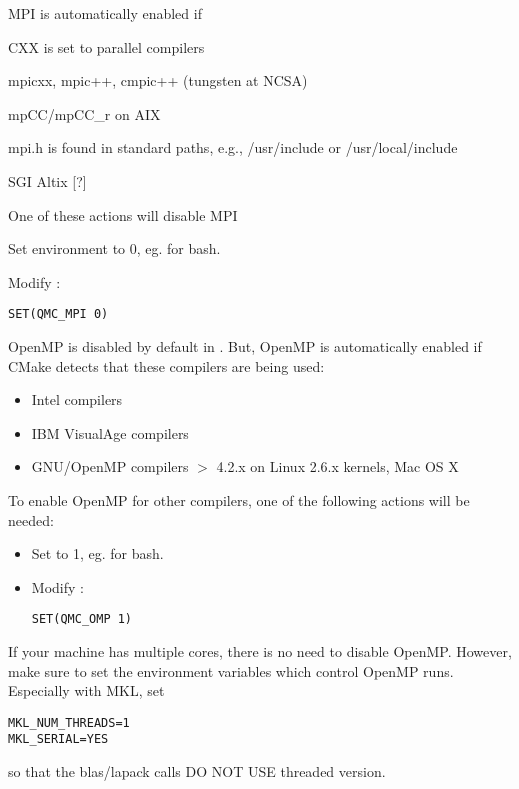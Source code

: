 MPI is automatically enabled if
\begin{itemize*}
  \item{} CXX is set to parallel compilers
  \begin{itemize*}
    \item{} mpicxx, mpic++, cmpic++ (tungsten at NCSA)
    \item{} mpCC/mpCC\_r on AIX 
  \end{itemize*}
  \item{} mpi.h is found in standard paths, e.g., /usr/include or /usr/local/include
  \begin{itemize*}
    \item{} SGI Altix  [?]
  \end{itemize*}
\end{itemize*}
One of these actions will disable MPI
\begin{itemize*}
  \item{} Set  environment to 0, eg.  for bash.
  \item{} Modify :
\begin{verbatim}
SET(QMC_MPI 0)
\end{verbatim}
\end{itemize*}

OpenMP is disabled by default in .  But, OpenMP is automatically enabled if CMake detects that these compilers are being used:
\begin{itemize}
  \item{} Intel compilers
  \item{} IBM VisualAge compilers
  \item{} GNU/OpenMP compilers $>$ 4.2.x on Linux 2.6.x kernels, Mac OS X 
\end{itemize}
To enable OpenMP for other compilers, one of the following actions will be needed:
\begin{itemize}
  \item{} Set  to 1, eg.  for bash.
  \item{} Modify :
\begin{verbatim}
SET(QMC_OMP 1)
\end{verbatim}
\end{itemize}

If your machine has multiple cores, there is no need to disable OpenMP.  However, make sure to set the environment variables which control OpenMP runs.  Especially with MKL, set
\begin{verbatim}
MKL_NUM_THREADS=1
MKL_SERIAL=YES
\end{verbatim}
so that the blas/lapack calls DO NOT USE threaded version.

